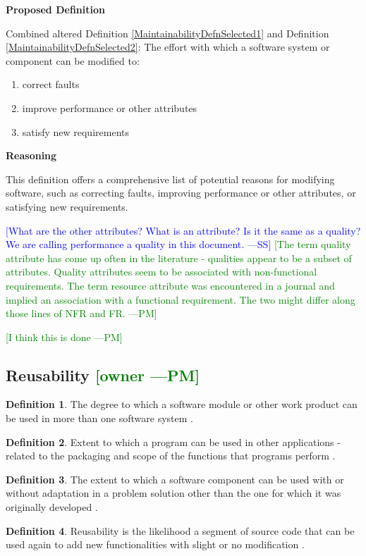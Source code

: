 \documentclass[letterpaper,cleveref]{lipics-v2019}
\newcommand{\authornote}[3]{\textcolor{#1}{[#3 ---#2]}}
\newcommand{\authornote}[3]{}
\newcommand{\wss}[1]{\authornote{blue}{SS}{#1}} %
\newcommand{\pmi}[1]{\authornote{green}{PM}{#1}} %
\theoremstyle{definition}
\newtheorem{defn}{Definition}
\begin{document}
\noindent \textbf{Proposed Definition}

Combined altered Definition \ref{MaintainabilityDefnSelected1} and Definition
\ref{MaintainabilityDefnSelected2}: The effort with which a software system or
component can be modified to:


\begin{enumerate}
	\item correct faults
	\item improve performance or other
	attributes
	\item satisfy new requirements
\end{enumerate}

\noindent \textbf{Reasoning}

This definition offers a comprehensive list of potential reasons for modifying
software, such as correcting faults, improving performance or other attributes,
or satisfying new requirements.

\wss{What are the other attributes?  What is an attribute?  Is it the
	same as a quality?  We are calling performance a quality in this document.}
\pmi{The term quality attribute has come up often in the literature - qualities
	appear to be a subset of attributes. Quality attributes seem to be associated
	with non-functional requirements. The term resource attribute was encountered in
	a journal and implied an association with a functional requirement. The two
	might differ along those lines of NFR and FR.}

\pmi{I think this is done}

\subsection{{Reusability} \pmi{owner}}

\begin{defn} 
  The degree to which a software module or other work product can be used in
  more than one software system \citep{IEEEStdGlossarySET1990}.
\end{defn}
\begin{defn}
  Extent to which a program can be used in other applications - related to the packaging and scope of the functions that programs perform \citep{McCallEtAl1977}. 
\end{defn}
\begin{defn} \label{ReusabilityDefnSelected} 
  The extent to which a software component can be used with or without
  adaptation in a problem solution other than the one for which it was
  originally developed \citep{kalagiakos2003non}.
\end{defn}
\begin{defn}
  Reusability is the likelihood a segment of source code that can be used again
  to add new functionalities with slight or no modification
  \citep{sandhu2010survey}.
\end{defn}
\end{document}
